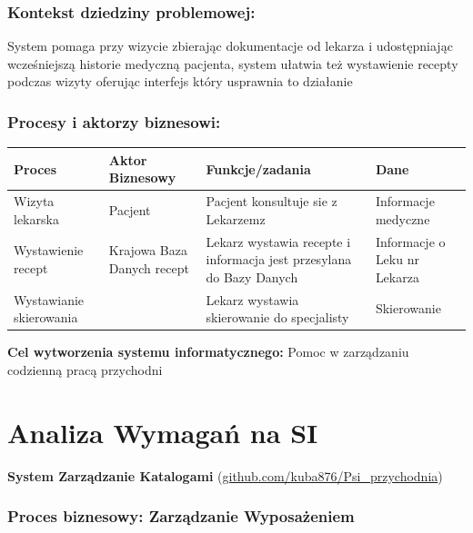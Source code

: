 \documentclass{article}
\begin{document}
\subsubsection*{Kontekst dziedziny problemowej:}
System pomaga przy wizycie zbierając dokumentacje od lekarza i udostępniając wcześniejszą historie medyczną pacjenta, system ułatwia też wystawienie recepty podczas wizyty oferując interfejs który usprawnia to działanie
\subsubsection*{Procesy i aktorzy biznesowi:}
\begin{center}

\begin{tabular}{|m{6em}|m{10em}|m{18em}|m{7em}|}
	\hline
	\rowcolor{lightgray} Proces & Aktor Biznesowy & Funkcje/zadania & Dane\\
	\hline
	Wizyta lekarska & Pacjent & Pacjent konsultuje sie z Lekarzemz& Informacje medyczne\\
	\hline
	Wystawienie recept & Krajowa Baza Danych recept&Lekarz wystawia recepte i informacja jest przesylana do Bazy Danych&Informacje o Leku \newline nr Lekarza\\
	\hline
	Wystawianie skierowania &  & Lekarz wystawia skierowanie do specjalisty & Skierowanie\\
	\hline 
	
\end{tabular}
\end{center}	
\textbf{Cel wytworzenia systemu informatycznego:} Pomoc w zarządzaniu codzienną pracą przychodni
\newpage
\section{Analiza Wymagań na SI}
\textbf{System Zarządzanie Katalogami}
(\url{github.com/kuba876/Psi_przychodnia})
\subsubsection*{Proces biznesowy: Zarządzanie Wyposażeniem}
\end{document}
